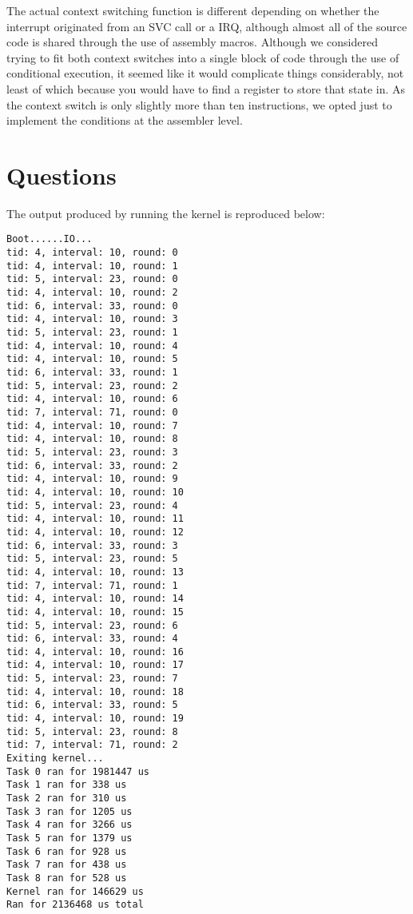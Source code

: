 \documentclass[titlepage]{article}
\begin{document}
The actual context switching function is different depending on whether the
interrupt originated from an SVC call or a IRQ, although almost all of the
source code is shared through the use of assembly macros. Although we considered
trying to fit both context switches into a single block of code through the use
of conditional execution, it seemed like it would complicate things
considerably, not least of which because you would have to find a register to
store that state in. As the context switch is only slightly more than ten
instructions, we opted just to implement the conditions at the assembler level.


\section{Questions}

The output produced by running the kernel is reproduced below:

\begin{verbatim}
Boot......IO...
tid: 4, interval: 10, round: 0
tid: 4, interval: 10, round: 1
tid: 5, interval: 23, round: 0
tid: 4, interval: 10, round: 2
tid: 6, interval: 33, round: 0
tid: 4, interval: 10, round: 3
tid: 5, interval: 23, round: 1
tid: 4, interval: 10, round: 4
tid: 4, interval: 10, round: 5
tid: 6, interval: 33, round: 1
tid: 5, interval: 23, round: 2
tid: 4, interval: 10, round: 6
tid: 7, interval: 71, round: 0
tid: 4, interval: 10, round: 7
tid: 4, interval: 10, round: 8
tid: 5, interval: 23, round: 3
tid: 6, interval: 33, round: 2
tid: 4, interval: 10, round: 9
tid: 4, interval: 10, round: 10
tid: 5, interval: 23, round: 4
tid: 4, interval: 10, round: 11
tid: 4, interval: 10, round: 12
tid: 6, interval: 33, round: 3
tid: 5, interval: 23, round: 5
tid: 4, interval: 10, round: 13
tid: 7, interval: 71, round: 1
tid: 4, interval: 10, round: 14
tid: 4, interval: 10, round: 15
tid: 5, interval: 23, round: 6
tid: 6, interval: 33, round: 4
tid: 4, interval: 10, round: 16
tid: 4, interval: 10, round: 17
tid: 5, interval: 23, round: 7
tid: 4, interval: 10, round: 18
tid: 6, interval: 33, round: 5
tid: 4, interval: 10, round: 19
tid: 5, interval: 23, round: 8
tid: 7, interval: 71, round: 2
Exiting kernel...
Task 0 ran for 1981447 us
Task 1 ran for 338 us
Task 2 ran for 310 us
Task 3 ran for 1205 us
Task 4 ran for 3266 us
Task 5 ran for 1379 us
Task 6 ran for 928 us
Task 7 ran for 438 us
Task 8 ran for 528 us
Kernel ran for 146629 us
Ran for 2136468 us total
\end{verbatim}
\end{document}
